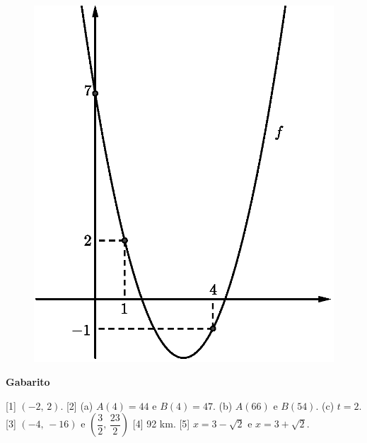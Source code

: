 \documentclass[12pt,a4paper]{article}
\begin{document}
\begin{enumerate}
  \begin{figure}[H]
   \centering
   \includegraphics[scale=0.625]{figura/grafico-funcao-polinomio-segundo-grau.eps}
  \end{figure}
\end{enumerate}

\begin{center}
  \textbf{Gabarito}
\end{center}

[1] $(-2,\,2)$. 
[2] (a) $A(4) = 44$ e $B(4) = 47$. (b) $A(66)$ e $B(54)$. (c) $t = 2$. 
[3] $(-4,\,-16)$ e $\left(\dfrac{3}{2},\,\dfrac{23}{2}\right)$
[4] 92 km. 
[5] $x = 3 - \sqrt{2}$ e $x = 3 + \sqrt{2}$.
\end{document}

